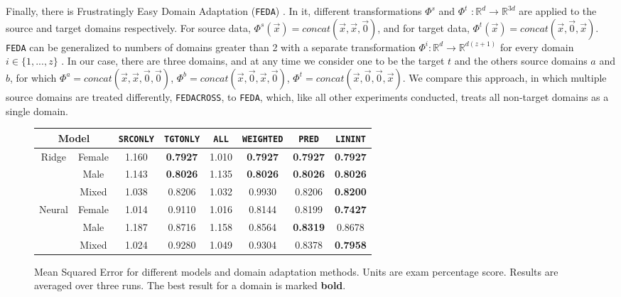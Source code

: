 \documentclass{article}
\begin{document}
Finally, there is Frustratingly Easy Domain Adaptation (\texttt{FEDA}) \cite{daume}. In it, different transformations \(\Phi^s\) and \(\Phi^t\) \( : \mathbb{R}^d \rightarrow \mathbb{R}^{3d}\) are applied to the source and target domains respectively. For source data, \(\Phi^s(\vec{x}) = concat(\vec{x}, \vec{x}, \vec{0})\), and for target data, \(\Phi^t(\vec{x}) = concat(\vec{x}, \vec{0}, \vec{x})\). \texttt{FEDA} can be generalized to numbers of domains greater than 2 with a separate transformation \(\Phi^i : \mathbb{R}^{d} \rightarrow \mathbb{R}^{d(z + 1)}\) for every domain \(i \in \{1, ..., z\}\) \citep{daume}. In our case, there are three domains, and at any time we consider one to be the target \(t\) and the others source domains \(a\) and \(b\), for which \(\Phi^a = concat(\vec{x}, \vec{x}, \vec{0}, \vec{0})\), \(\Phi^b = concat(\vec{x}, \vec{0}, \vec{x}, \vec{0})\), \(\Phi^t = concat(\vec{x}, \vec{0}, \vec{0}, \vec{x})\). We compare this approach, in which multiple source domains are treated differently, \texttt{FEDACROSS}, to \texttt{FEDA}, which, like all other experiments conducted, treats all non-target domains as a single domain.

\begin{figure}[h]
\label{baselines}
\centering{}
\begin{center}
\begin{tabular}{ |c|c||c|c|c|c|c|c| }
 \hline
 \multicolumn{2}{|c|}{Model} & \texttt{SRCONLY} & \texttt{TGTONLY} & \texttt{ALL} & \texttt{WEIGHTED} & \texttt{PRED} & \texttt{LININT} \\ 
 \hline
 \hline
 \multirow{3}{*}{Ridge} & Female & 1.160 & \textbf{0.7927} & 1.010 & \textbf{0.7927} & \textbf{0.7927} & \textbf{0.7927} \\  
 \cline{2-8}
       & Male                    & 1.143 & \textbf{0.8026} & 1.135 & \textbf{0.8026} & \textbf{0.8026} & \textbf{0.8026} \\
 \cline{2-8}
       & Mixed                    & 1.038      & 0.8206 & 1.032 & 0.9930 & 0.8206 & \textbf{0.8200} \\
 \hline
 \multirow{3}{*}{Neural} & Female & 1.014 & 0.9110 & 1.016 & 0.8144 & 0.8199 & \textbf{0.7427} \\
 \cline{2-8}
       & Male & 1.187 & 0.8716 & 1.158 & 0.8564 & \textbf{0.8319} & 0.8678 \\
 \cline{2-8}
       & Mixed                    & 1.024 & 0.9280 & 1.049 & 0.9304 & 0.8378 & \textbf{0.7958} \\
 \hline
\end{tabular}
\end{center}
\caption{Mean Squared Error for different models and domain adaptation methods. Units are exam percentage score. Results are averaged over three runs. The best result for a domain is marked \textbf{bold}.}
\end{figure}
\end{document}
